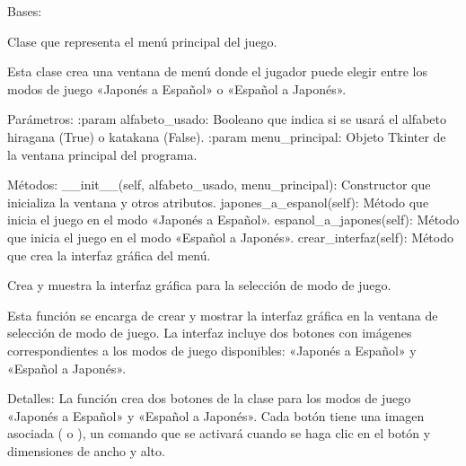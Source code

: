 \documentclass[letterpaper,10pt,spanish]{sphinxmanual}
\begin{document}
\begin{fulllineitems}
\label{\detokenize{menu_juego:menu_juego.MenuJuego}}
\pysigstartsignatures
{}
\pysigstopsignatures
\sphinxAtStartPar
Bases: 

\sphinxAtStartPar
Clase que representa el menú principal del juego.

\sphinxAtStartPar
Esta clase crea una ventana de menú donde el jugador puede elegir entre los modos
de juego «Japonés a Español» o «Español a Japonés».

\sphinxAtStartPar
Parámetros:
:param alfabeto\_usado: Booleano que indica si se usará el alfabeto hiragana (True) o katakana (False).
:param menu\_principal: Objeto Tkinter de la ventana principal del programa.

\sphinxAtStartPar
Métodos:
\sphinxhyphen{} \_\_init\_\_(self, alfabeto\_usado, menu\_principal): Constructor que inicializa la ventana y otros atributos.
\sphinxhyphen{} japones\_a\_espanol(self): Método que inicia el juego en el modo «Japonés a Español».
\sphinxhyphen{} espanol\_a\_japones(self): Método que inicia el juego en el modo «Español a Japonés».
\sphinxhyphen{} crear\_interfaz(self): Método que crea la interfaz gráfica del menú.

\begin{fulllineitems}
\label{\detokenize{menu_juego:menu_juego.MenuJuego.crear_interfaz}}
\pysigstartsignatures
{}
\pysigstopsignatures
\sphinxAtStartPar
Crea y muestra la interfaz gráfica para la selección de modo de juego.

\sphinxAtStartPar
Esta función se encarga de crear y mostrar la interfaz gráfica en la ventana de selección de modo de juego.
La interfaz incluye dos botones con imágenes correspondientes a los modos de juego disponibles: «Japonés a
Español» y «Español a Japonés».

\sphinxAtStartPar
Detalles:
La función crea dos botones de la clase  para los modos de juego «Japonés a Español» y
«Español a Japonés». Cada botón tiene una imagen asociada ( o
), un comando que se activará cuando se haga clic en el botón y dimensiones de
ancho y alto.


\end{fulllineitems}
\end{fulllineitems}
\end{document}
